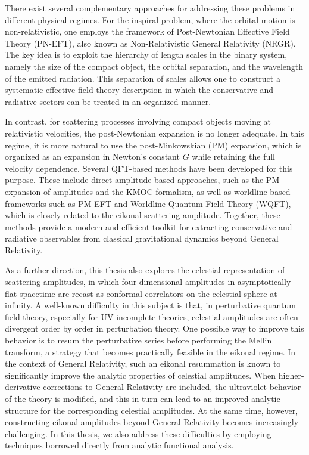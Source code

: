 There exist several complementary approaches for addressing these problems in different physical regimes. For the inspiral problem, where the orbital motion is non-relativistic, one employs the framework of Post-Newtonian Effective Field Theory (PN-EFT), also known as Non-Relativistic General Relativity (NRGR). The key idea is to exploit the hierarchy of length scales in the binary system, namely the size of the compact object, the orbital separation, and the wavelength of the emitted radiation. This separation of scales allows one to construct a systematic effective field theory description in which the conservative and radiative sectors can be treated in an organized manner.

In contrast, for scattering processes involving compact objects moving at relativistic velocities, the post-Newtonian expansion is no longer adequate. In this regime, it is more natural to use the post-Minkowskian (PM) expansion, which is organized as an expansion in Newton's constant $G$ while retaining the full velocity dependence. Several QFT-based methods have been developed for this purpose. These include direct amplitude-based approaches, such as the PM expansion of amplitudes and the KMOC formalism, as well as worldline-based frameworks such as PM-EFT and Worldline Quantum Field Theory (WQFT), which is closely related to the eikonal scattering amplitude. Together, these methods provide a modern and efficient toolkit for extracting conservative and radiative observables from classical gravitational dynamics beyond General Relativity.

As a further direction, this thesis also explores the celestial representation of scattering amplitudes, in which four-dimensional amplitudes in asymptotically flat spacetime are recast as conformal correlators on the celestial sphere at infinity. A well-known difficulty in this subject is that, in perturbative quantum field theory, especially for UV-incomplete theories, celestial amplitudes are often divergent order by order in perturbation theory. One possible way to improve this behavior is to resum the perturbative series before performing the Mellin transform, a strategy that becomes practically feasible in the eikonal regime. In the context of General Relativity, such an eikonal resummation is known to significantly improve the analytic properties of celestial amplitudes. When higher-derivative corrections to General Relativity are included, the ultraviolet behavior of the theory is modified, and this in turn can lead to an improved analytic structure for the corresponding celestial amplitudes. At the same time, however, constructing eikonal amplitudes beyond General Relativity becomes increasingly challenging. In this thesis, we also address these difficulties by employing techniques borrowed directly from analytic functional analysis.

